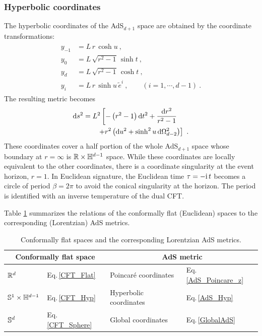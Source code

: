 \subsubsection{Hyperbolic coordinates}
The hyperbolic coordinates of the AdS$_{d+1}$ space are obtained by the coordinate transformations:
\begin{align}
\begin{aligned}
y_{-1} &= L\, r\, \cosh u \ , \\ 
y_0 &= L\,\sqrt{r^2 - 1}\, \sinh t \ , \\
y_d &= L\,\sqrt{r^2 - 1}\, \cosh t \ ,  \\
y_i &= L\,r\,\sinh u \,\tilde e^i \ , \qquad (i=1,\cdots,d-1) \ .
\end{aligned}
\end{align}
The resulting metric becomes
\begin{align}\label{AdS_Hyp}
\begin{aligned}
\mathrm{d} s^2 &=L^2\left[  -\left(r^2 - 1 \right) \mathrm{d} t^2 + \frac{\mathrm{d} r^2}{r^2 - 1}\right.\\ 
	&\qquad \left. + r^2 \left( \mathrm{d} u^2 + \sinh^2 u\, \mathrm{d}\Omega_{d-2}^2\right) \right]\ .
\end{aligned}
\end{align}
These coordinates cover a half portion of the whole AdS$_{d+1}$ space whose boundary at $r=\infty$ is $\mathbb{R} \times \mathbb{H}^{d-1}$ space.
While these coordinates are locally equivalent to the other coordinates, there is a coordinate singularity at the event horizon, $r=1$.
In Euclidean signature, the Euclidean time $\tau = - \mathrm{i}\, t$ becomes a circle of period  $\beta = 2\pi$ to avoid the conical singularity at the horizon.
The period is identified with an inverse temperature of the dual CFT.


Table \ref{tab:AdS_Coord_Summary} summarizes the relations of the conformally flat (Euclidean) spaces to the corresponding (Lorentzian) AdS metrics.
\begin{table}[htbp]
\caption{\label{tab:AdS_Coord_Summary}Conformally flat spaces and the corresponding Lorentzian AdS metrics.}
\begin{ruledtabular}
\begin{tabular}{llll}
\multicolumn{2}{c}{ Conformally flat space} & \multicolumn{2}{c}{AdS metric}\\ \hline
 $\mathbb{R}^d$ & Eq.\,\eqref{CFT_Flat} & Poincar{\'e} coordinates & Eq.\,\eqref{AdS_Poincare_z} \\
 $\mathbb{S}^1 \times \mathbb{H}^{d-1}$ & Eq.\,\eqref{CFT_Hyp} & Hyperbolic coordinates & Eq.\,\eqref{AdS_Hyp} \\
 $\mathbb{S}^d$ & Eq.\,\eqref{CFT_Sphere} & Global coordinates & Eq.\,\eqref{GlobalAdS}
\end{tabular}
\end{ruledtabular}
\end{table}




